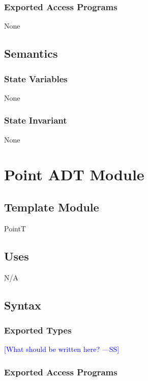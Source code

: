 \documentclass[12pt]{article}
\newcommand{\authornote}[3]{\textcolor{#1}{[#3 ---#2]}}
\newcommand{\authornote}[3]{}
\newcommand{\wss}[1]{\authornote{blue}{SS}{#1}}
\begin{document}
\subsubsection* {Exported Access Programs}

None

\subsection* {Semantics}

\subsubsection* {State Variables}

None

\subsubsection* {State Invariant}

None

\newpage

\section* {Point ADT Module}

\subsection*{Template Module}

PointT

\subsection* {Uses}

N/A

\subsection* {Syntax}

\subsubsection* {Exported Types}

\wss{What should be written here?}

\subsubsection* {Exported Access Programs}
\end{document}
